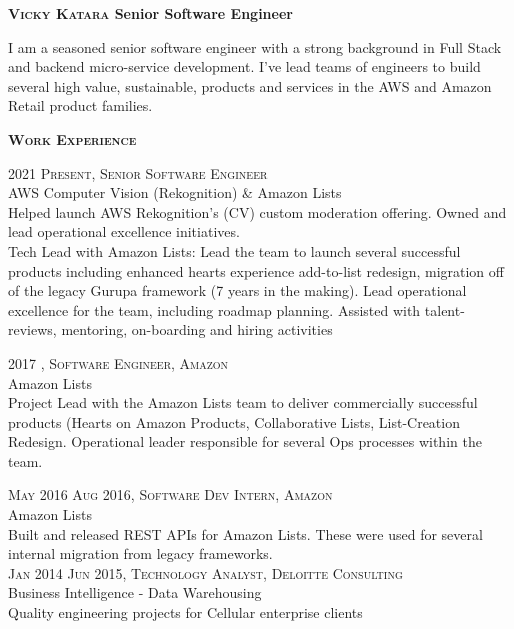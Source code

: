 \documentclass[letterpaper,12pt,final]{memoir}
\newcommand{\Sep}{\vspace{1.5em}}
\newcommand{\SmallSep}{\vspace{0.5em}}
\newenvironment{Objective}
	{\ignorespaces\textbf{\color{Plum} Objective}}
	{\Sep\ignorespacesafterend}
\newcommand{\CVSection}[1]
	{\Large\textbf{\textsc{{#1}}}\par
	\SmallSep\normalsize\normalfont}
\newcommand{\CVItem}[1]
	{\textsc{\color{Plum} #1}}
\begin{document}
\Huge\bfseries \textsc{\color{Plum} Vicky Katara}
{\normalsize \bfseries  Senior Software Engineer }
\SmallSep

\normalsize\normalfont

\begin{footnotesize}
I am a seasoned senior software engineer with a strong background in Full Stack and backend micro-service development. I've lead teams of engineers to build several high value, sustainable, products and services in the AWS  and Amazon Retail product families.
\end{footnotesize}

\CVSection{Work Experience}

\CVItem{2021 \textendash \space Present, Senior Software Engineer}\\
\SmallSep
AWS Computer Vision (Rekognition) \& Amazon Lists\\
{\footnotesize Helped launch AWS Rekognition's (CV) custom moderation offering. Owned and lead operational excellence initiatives.\\
Tech Lead with Amazon Lists: Lead the team to launch several successful products including enhanced hearts experience add-to-list redesign, migration off of the legacy Gurupa framework (7 years in the making). Lead operational excellence for the team, including roadmap planning. Assisted with talent-reviews, mentoring, on-boarding and hiring activities}

\CVItem{2017 \textendash {}, Software Engineer, Amazon}\\
\SmallSep
Amazon Lists\\
{\footnotesize Project Lead with the Amazon Lists team to deliver commercially successful products (Hearts on Amazon Products, Collaborative Lists, List-Creation Redesign. Operational leader responsible for several Ops processes within the team.}

\CVItem{May 2016 \textendash \space Aug 2016, Software Dev Intern, Amazon}\\
\SmallSep
Amazon Lists\\
{\footnotesize Built and released REST APIs for Amazon Lists. These were used for several internal migration from legacy frameworks.}
\SmallSep\\
\CVItem{Jan 2014 \textendash \space Jun 2015, Technology Analyst, Deloitte Consulting}\\
\SmallSep
Business Intelligence - Data Warehousing\\
{\footnotesize Quality engineering projects for Cellular enterprise clients}
\SmallSep
\end{document}
